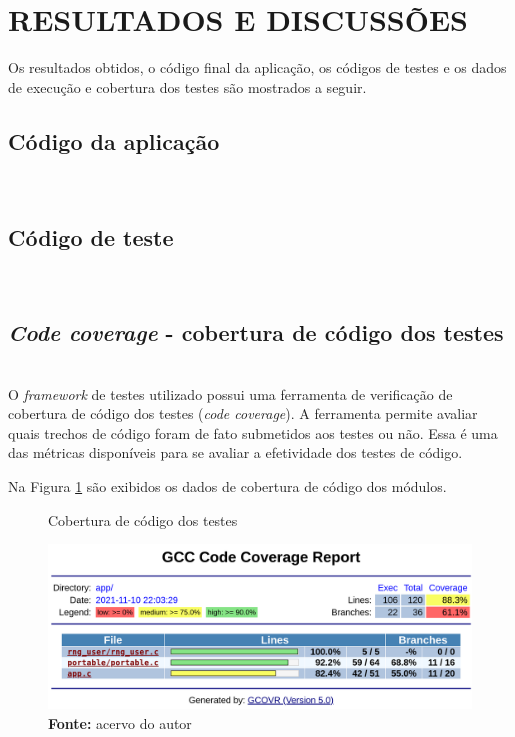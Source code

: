 \documentclass[times, twoside, watermark]{artigo}
\begin{document}

\section{RESULTADOS E DISCUSSÕES}
Os resultados obtidos, o código final da aplicação, os códigos de testes e os dados 
de execução e cobertura dos testes são mostrados a seguir.

\subsection{Código da aplicação}\hfill\\

\subsection{Código de teste}\hfill\\

\subsection{\textit{Code coverage} - cobertura de código dos testes}\hfill\\

O \textit{framework} de testes utilizado possui uma ferramenta de verificação 
de cobertura de código dos testes (\textit{code coverage}). A ferramenta permite 
avaliar quais trechos de código foram de fato submetidos aos testes ou não.
Essa é uma das métricas disponíveis para se avaliar a efetividade dos testes de 
código.

Na Figura \ref{fig:code-coverage} são exibidos os dados de cobertura de código 
dos módulos. \hfill\\

\begin{figure}[H]
  \centering
  \caption{Cobertura de código dos testes}
  \includegraphics[width=1\linewidth]{images/code-coverage-2.png}
  \caption*{\newline\textbf{Fonte:} acervo do autor}
  \label{fig:code-coverage}
\end{figure}
\end{document}
